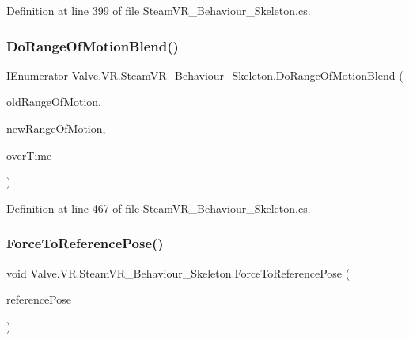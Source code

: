 Definition at line 399 of file Steam\+V\+R\+\_\+\+Behaviour\+\_\+\+Skeleton.\+cs.

\mbox{\label{class_valve_1_1_v_r_1_1_steam_v_r___behaviour___skeleton_a05b116198babb8d928f402fee958f758}} 
\subsubsection{\texorpdfstring{DoRangeOfMotionBlend()}{DoRangeOfMotionBlend()}}
{\footnotesize\ttfamily I\+Enumerator Valve.\+V\+R.\+Steam\+V\+R\+\_\+\+Behaviour\+\_\+\+Skeleton.\+Do\+Range\+Of\+Motion\+Blend (\begin{DoxyParamCaption}\item[{\mbox{\hyperlink{namespace_valve_1_1_v_r_affc8d18345f8f5d36f1ae7b4ce534500}{E\+V\+R\+Skeletal\+Motion\+Range}}}]{old\+Range\+Of\+Motion,  }\item[{\mbox{\hyperlink{namespace_valve_1_1_v_r_affc8d18345f8f5d36f1ae7b4ce534500}{E\+V\+R\+Skeletal\+Motion\+Range}}}]{new\+Range\+Of\+Motion,  }\item[{float}]{over\+Time }\end{DoxyParamCaption})\hspace{0.3cm}{\ttfamily [protected]}}



Definition at line 467 of file Steam\+V\+R\+\_\+\+Behaviour\+\_\+\+Skeleton.\+cs.

\mbox{\label{class_valve_1_1_v_r_1_1_steam_v_r___behaviour___skeleton_adc97033308aa208c491f73c49ca62231}} 
\subsubsection{\texorpdfstring{ForceToReferencePose()}{ForceToReferencePose()}}
{\footnotesize\ttfamily void Valve.\+V\+R.\+Steam\+V\+R\+\_\+\+Behaviour\+\_\+\+Skeleton.\+Force\+To\+Reference\+Pose (\begin{DoxyParamCaption}\item[{\mbox{\hyperlink{namespace_valve_1_1_v_r_a299b655881f873256f035349b59da09e}{E\+V\+R\+Skeletal\+Reference\+Pose}}}]{reference\+Pose }\end{DoxyParamCaption})}



